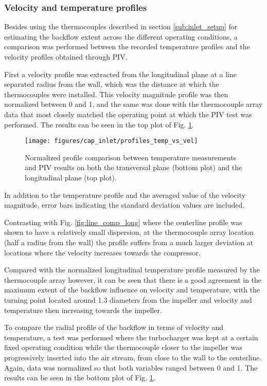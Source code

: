 \subsubsection{Velocity and temperature profiles}

Besides using the thermocouples described in section \ref{sub:inlet_setup} for estimating the backflow extent across the different operating conditions, a comparison was performed between the recorded temperature profiles and the velocity profiles obtained through PIV.

First a velocity profile was extracted from the longitudinal plane at a line  separated  radius from the wall, which was the distance at which the thermocouples were installed. This velocity magnitude profile was then normalized between 0 and 1, and the same was done with the thermocouple array data that most closely matched the operating point at which the PIV test was performed. The results can be seen in the top plot of Fig. \ref{fig:profiles_temp_vs_vel}.

\begin{figure}[tb!]
\centering
\texttt{[image: figures/cap\_inlet/profiles\_temp\_vs\_vel]}
\caption{Normalized profile comparison between temperature measurements and PIV results on both the transversal plane (bottom plot) and the longitudinal plane (top plot).}
\label{fig:profiles_temp_vs_vel}
\end{figure}

In addition to the temperature profile and the averaged value of the velocity magnitude, error bars indicating the standard deviation values are included.

Contrasting with Fig. \ref{fig:line_comp_long} where the centerline profile was shown to have a relatively small dispersion, at the thermocouple array location (half a radius from the wall) the profile suffers from a much larger deviation at locations where the velocity increases towards the compressor.

Compared with the normalized longitudinal temperature profile measured by the thermocouple array however, it can be seen that there is a good agreement in the maximum extent of the backflow influence on velocity and temperature, with the turning point located around 1.3 diameters from the impeller and velocity and temperature then increasing towards the impeller.

To compare the radial profile of the backflow in terms of velocity and temperature, a test was performed where the turbocharger was kept at a certain fixed operating condition while the thermocouple closer to the impeller was progressively inserted into the air stream, from close to the wall to the centerline. Again, data was normalized so that both variables ranged between 0 and 1. The results can be seen in the bottom plot of Fig. \ref{fig:profiles_temp_vs_vel}.

